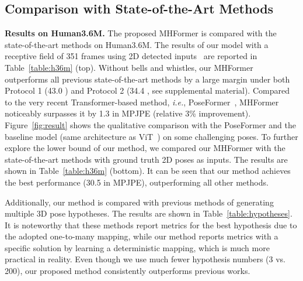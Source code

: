\documentclass[10pt,twocolumn,letterpaper]{article}
\begin{document}
\subsection{Comparison with State-of-the-Art Methods}
\noindent
\textbf{Results on Human3.6M.}
The proposed MHFormer is compared with the state-of-the-art methods on Human3.6M. 
The results of our model with a receptive field of 351 frames using 2D detected inputs~\cite{chen2018cascaded} are reported in Table~\ref {table:h36m} (top). 
Without bells and whistles, our MHFormer outperforms all previous state-of-the-art methods by a large margin under both Protocol 1 (43.0 ) and Protocol 2 (34.4 , see supplemental material). 
Compared to the very recent Transformer-based method, \emph{i.e.}, PoseFormer~\cite{poseformer}, MHFormer noticeably surpasses it by 1.3  in MPJPE (relative 3\% improvement). 
Figure~\ref{fig:result} shows the qualitative comparison with the PoseFormer and the baseline model (same architecture as ViT~\cite{dosovitskiy2020image}) on some challenging poses. 
To further explore the lower bound of our method, we compared our MHFormer with the state-of-the-art methods with ground truth 2D poses as inputs. 
The results are shown in Table~\ref{table:h36m} (bottom). 
It can be seen that our method achieves the best performance (30.5  in MPJPE), outperforming all other methods. 

Additionally, our method is compared with previous methods of generating multiple 3D pose hypotheses. 
The results are shown in Table~\ref{table:hypotheses}. 
It is noteworthy that these methods report metrics for the best hypothesis due to the adopted one-to-many mapping, while our method reports metrics with a specific solution by learning a deterministic mapping, which is much more practical in reality. 
Even though we use much fewer hypothesis numbers (3 vs. 200), our proposed method consistently outperforms previous works. 
\end{document}
